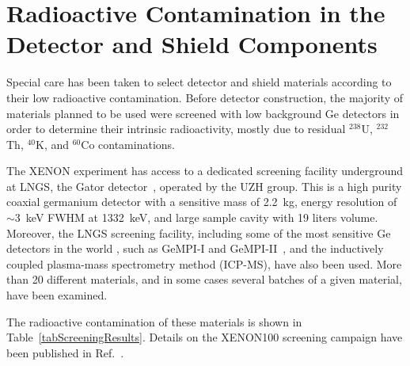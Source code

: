\section{Radioactive Contamination in the Detector and Shield Components}
\label{secScreening}

Special care has been taken to select detector and shield materials according to their low radioactive contamination. Before detector construction, the majority of materials planned to be used were screened with low background Ge detectors in order to determine their intrinsic radioactivity, mostly due to residual $^{238}$U, $^{232}$Th, $^{40}$K, and $^{60}$Co contaminations.

The XENON experiment has access to a dedicated screening facility underground at LNGS, the Gator detector~\cite{gator}, operated by the UZH group. This is a high purity coaxial germanium detector with a sensitive mass of 2.2~kg, energy resolution of $\sim$3~keV FWHM at 1332~keV, and large sample cavity with 19 liters volume. Moreover, the LNGS screening facility, including some of the most sensitive Ge detectors in the world \cite{LNGSfacility}, such as GeMPI-I and GeMPI-II~\cite{GeMPI}, and the inductively coupled plasma-mass spectrometry method (ICP-MS), have also been used. More than 20 different materials, and in some cases several batches of a given material, have been examined.

The radioactive contamination of these materials is shown in Table~\ref{tabScreeningResults}. Details on the XENON100 screening campaign have been published in Ref.~\cite{ScreeningPaper}.

